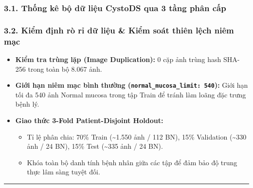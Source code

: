 \documentclass[
  11pt,
  a4paper,
]{article}
\providecommand{\tightlist}{%
  \setlength{\itemsep}{0pt}\setlength{\parskip}{0pt}}
\begin{document}
\subsubsection{3.1. Thống kê bộ dữ liệu CystoDS qua 3 tầng phân
cấp}\label{thux1ed1ng-kuxea-bux1ed9-dux1eef-liux1ec7u-cystods-qua-3-tux1ea7ng-phuxe2n-cux1ea5p}

\begin{table}[H]
\centering
\caption{Bảng 2.}
\label{tab:sec_table2}
\vspace{3pt}
\end{table}

\subsubsection{3.2. Kiểm định rò rỉ dữ liệu \& Kiểm soát thiên lệch niêm
mạc}\label{kiux1ec3m-ux111ux1ecbnh-ruxf2-rux1ec9-dux1eef-liux1ec7u-kiux1ec3m-souxe1t-thiuxean-lux1ec7ch-niuxeam-mux1ea1c}

\begin{itemize}
\tightlist
\item
  \textbf{Kiểm tra trùng lặp (Image Duplication):} 0 cặp ảnh trùng hash
  SHA-256 trong toàn bộ 8.067 ảnh.
\item
  \textbf{Giới hạn niêm mạc bình thường
  (\texttt{normal\_mucosa\_limit:\ 540}):} Giới hạn tối đa 540 ảnh
  Normal mucosa trong tập Train để tránh làm loãng đặc trưng bệnh lý.
\item
  \textbf{Giao thức 3-Fold Patient-Disjoint Holdout:}

  \begin{itemize}
  \tightlist
  \item
    Tỉ lệ phân chia: 70\% Train (\textasciitilde1.550 ảnh / 112 BN),
    15\% Validation (\textasciitilde330 ảnh / 24 BN), 15\% Test
    (\textasciitilde335 ảnh / 24 BN).
  \item
    Khóa toàn bộ danh tính bệnh nhân giữa các tập để đảm bảo độ trung
    thực lâm sàng tuyệt đối.
  \end{itemize}
\end{itemize}

\begin{center}\rule{0.5\linewidth}{0.5pt}\end{center}
\end{document}
